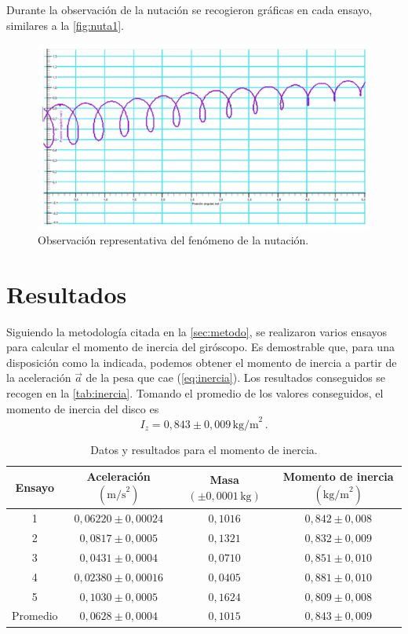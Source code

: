 \documentclass[a4paper]{article}
\begin{document}
Durante la observación de la nutación se recogieron gráficas en cada ensayo, similares a la \autoref{fig:nuta1}.
\begin{figure}[H]
\begin{center}
\includegraphics[width=12 cm]{nuta1.png}
\caption{Observación representativa del fenómeno de la nutación.}
\label{fig:nuta1}
\end{center}
\end{figure}

\section{Resultados} \label{sec:resultados}

Siguiendo la metodología citada en la \autoref{sec:metodo}, se realizaron varios ensayos para calcular el momento de inercia del giróscopo. Es demostrable que, para una disposición como la indicada, podemos obtener el momento de inercia a partir de la aceleración $\vec{a}$ de la pesa que cae (\autoref{eq:inercia}). Los resultados conseguidos se recogen en la \autoref{tab:inercia}. Tomando el promedio de los valores conseguidos, el momento de inercia del disco es
\begin{equation}
I_z=0,843\pm 0,009\,\text{kg/m}^2\,.
\end{equation}
\begin{table}[h]
\begin{center}
\begin{tabular}{|c|c|c|c|}
\hline
Ensayo & Aceleración $\left(\text{m/s}^2\right)$ & Masa $\left(\pm 0,0001\,\text{kg}\right)$ & Momento de inercia $\left(\text{kg/m}^2\right)$\\
\hline
1 & $0,06220\pm 0,00024$ & $0,1016$ & $0,842\pm 0,008$\\
\hline
2 & $0,0817\pm 0,0005$ & $0,1321$ & $0,832\pm 0,009$\\
\hline
3 & $0,0431\pm 0,0004$ & $0,0710$ & $0,851\pm 0,010$\\
\hline
4 & $0,02380\pm 0,00016$ & $0,0405$ & $0,881\pm 0,010$\\
\hline
5 & $0,1030\pm 0,0005$ & $0,1624$ & $0,809\pm 0,008$\\
\hline
Promedio & $0,0628\pm 0,0004$ & $0,1015$ & $0,843\pm 0,009$\\
\hline
\end{tabular}
\caption{Datos y resultados para el momento de inercia.}
\label{tab:inercia}
\end{center}
\end{table}
\end{document}
